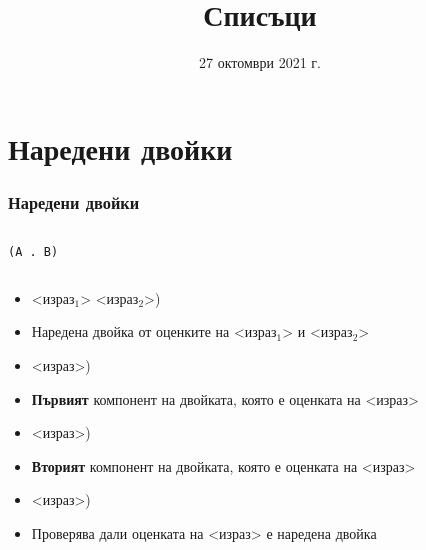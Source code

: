 \documentclass[alsotrans]{beamerswitch}
\title{Списъци}
\date{27 октомври 2021 г.}
\begin{document}
\begin{frame}
  \titlepage
\end{frame}

\section{Наредени двойки}

\begin{frame}
  \frametitle{Наредени двойки}

  \begin{columns}[t,onlytextwidth]
    \begin{column}{.5\textwidth}
      \vspace{2ex}
      \begin{center}
        \tt{(A . B)}
      \end{center}
    \end{column}
    \begin{column}{.5\textwidth}
      \begin{center}
      \end{center}
    \end{column}
  \end{columns}
  \pause
  \vspace{2ex}
  \begin{itemize}[<+->]
  \item {} <израз$_1$> <израз$_2$>\tta)
  \item Наредена двойка от оценките на <израз$_1$> и <израз$_2$>
  \item {} <израз>\tta)
  \item \textbf{Първият} компонент на двойката, която е оценката на <израз>
  \item {} <израз>\tta)
  \item \textbf{Вторият} компонент на двойката, която е оценката на <израз>
  \item {}   <израз>\tta)
  \item Проверява дали оценката на <израз> е наредена двойка
  \end{itemize}
\end{frame}
\end{document}

